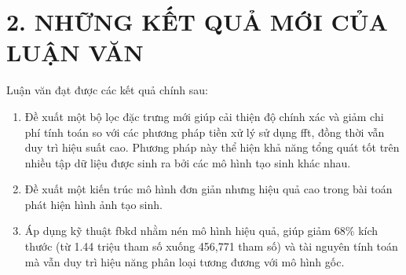 \section*{2. NHỮNG KẾT QUẢ MỚI CỦA LUẬN VĂN}
Luận văn đạt được các kết quả chính sau:

\begin{enumerate}
	\item Đề xuất một bộ lọc đặc trưng mới giúp cải thiện độ chính xác và giảm chi phí tính toán so với các phương pháp tiền xử lý sử dụng \gls{fft}, đồng thời vẫn duy trì hiệu suất cao. Phương pháp này thể hiện khả năng tổng quát tốt trên nhiều tập dữ liệu được sinh ra bởi các mô hình tạo sinh khác nhau.


	\item Đề xuất một kiến trúc mô hình đơn giản nhưng hiệu quả cao trong bài toán phát hiện hình ảnh tạo sinh.
	
	\item Áp dụng kỹ thuật \gls{fbkd} nhằm nén mô hình hiệu quả, giúp giảm 68\% kích thước (từ 1.44 triệu tham số xuống 456,771 tham số) và tài nguyên tính toán mà vẫn duy trì hiệu năng phân loại tương đương với mô hình gốc.
	
\end{enumerate}


